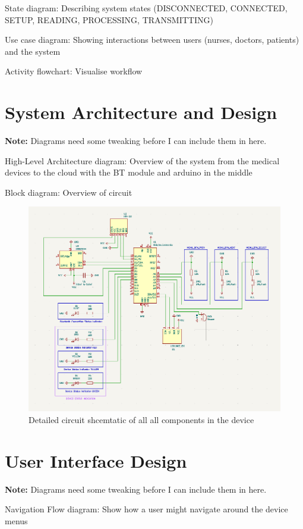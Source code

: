 State diagram: Describing system states (DISCONNECTED, CONNECTED, SETUP, READING, PROCESSING, TRANSMITTING)

Use case diagram: Showing interactions between users (nurses, doctors, patients) and the system

Activity flowchart: Visualise workflow

\section{System Architecture and Design} %
\textbf{Note:} Diagrams need some tweaking before I can include them in here.

High-Level Architecture diagram: Overview of the system from the medical devices to the cloud with the BT module and arduino in the middle

Block diagram: Overview of circuit

\begin{figure}[H]
\centering
\includegraphics[scale=0.6]{images/schematic_rev2}
\caption{Detailed circuit shcemtatic of all all components in the device}
\label{fig:circuit_diagram}
\end{figure}

\section{User Interface Design} %
\textbf{Note:} Diagrams need some tweaking before I can include them in here.

Navigation Flow diagram: Show how a user might navigate around the device menus


